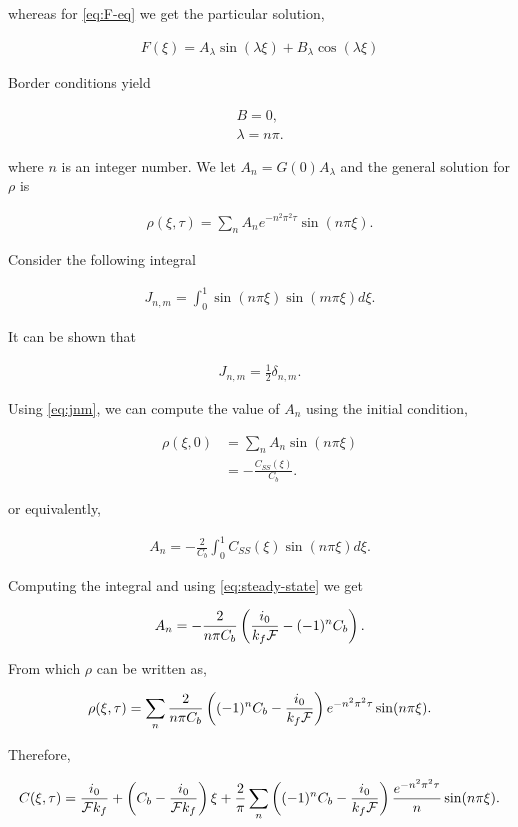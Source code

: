 whereas for \ref{eq:F-eq} we get the particular solution,

\begin{align}
	F(\xi) = A_\lambda\sin(\lambda \xi) + B_\lambda\cos(\lambda \xi)
\end{align}

Border conditions yield 

\begin{align}
	B = 0,\\
	\lambda = n\pi.
\end{align}

where $n$ is an integer number. We let $A_n = G(0) A_\lambda$ and the general solution for $\rho$ is

\begin{align}
	\rho(\xi, \tau) = \sum_n A_n e^{-n^2\pi^2 \tau}\sin(n\pi \xi).
\end{align}


Consider the following integral

\begin{align}
	J_{n,m} = \int_0^1 \sin(n\pi\xi) \sin(m\pi\xi) d\xi.
\end{align}

It can be shown that 

\begin{align}
	J_{n,m} = \frac{1}{2}\delta_{n,m}.
	\label{eq:jnm}
\end{align}

Using \ref{eq:jnm}, we can compute the value of $A_n$ using the initial condition,

\begin{align}
	\rho(\xi, 0) &= \sum_n A_n \sin(n\pi\xi)\\
	 &= -\frac{C_{SS}(\xi)}{C_b}.
\end{align}

or equivalently,

\begin{align}
	A_n = -\frac{2}{C_b} \int_0^1 C_{SS}(\xi)\sin(n\pi\xi) d\xi.
\end{align}

Computing the integral and using \ref{eq:steady-state} we get

\begin{align}
	A_n = -\frac{2}{n\pi C_b} \left({\frac{i_0}{k_f\mathcal{F}} - (-1)^n C_b}\right).
\end{align}


From which $\rho$ can be written as,

\begin{align}
	\rho(\xi, \tau) = \sum_n \frac{2}{n\pi C_b} \left({(-1)^n C_b- \frac{i_0}{k_f\mathcal{F}}}\right) e^{-n^2\pi^2\tau}\sin(n\pi\xi).
\end{align}


Therefore,

\begin{align}
	C(\xi, \tau) = \frac{i_0}{\mathcal{F}k_f} +\left({C_b - \frac{i_0}{\mathcal{F}k_f}}\right)\xi +\frac{2}{\pi}\sum_n \left({(-1)^n C_b- \frac{i_0}{k_f\mathcal{F}}}\right) \frac{e^{-n^2\pi^2\tau}}{n}\sin(n\pi\xi).
\end{align}
